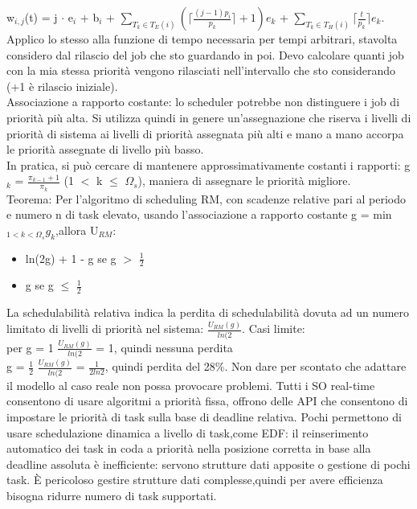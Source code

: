 \documentclass[12pt, oneside]{extbook}
\begin{document}
w$_{i,j}$(t) = j $\cdot$ e$_i$ + b$_i$ + $\sum\limits_{T_k \in T_E(i)} (\lceil \frac{(j-1)p_i}{p_k} \rceil + 1)e_k$ + $\sum\limits_{T_k \in T_H(i)} \lceil \frac{t}{p_k} \rceil e_k$. Applico lo stesso alla funzione di tempo necessaria per tempi arbitrari, stavolta considero dal rilascio del job che sto guardando in poi. Devo calcolare quanti job con la mia stessa priorità vengono rilasciati nell'intervallo che sto considerando (+1 è rilascio iniziale).\\ Associazione a rapporto costante: lo scheduler potrebbe non distinguere i job di priorità più alta. Si utilizza quindi in genere un'assegnazione  che riserva i livelli di priorità di sistema ai livelli di priorità assegnata più alti e mano a mano accorpa le priorità assegnate di livello più basso.\\ In pratica, si può cercare di mantenere approssimativamente costanti i rapporti: g$_k$ = $\frac{\pi_{k-1} + 1}{\pi_k}$ (1 $<$ k $\leq$ $\Omega_s$), maniera di assegnare le priorità migliore.\\ Teorema: Per l'algoritmo di scheduling RM,  con scadenze relative pari al periodo e numero n di task elevato, usando l'associazione a rapporto costante g = min$_{1 < k < \Omega_s} g_k$,allora U$_{RM}$:
\begin{itemize}
\item ln(2g) + 1 - g se g $>$ $\frac{1}{2}$
\item g se g $\leq$ $\frac{1}{2}$
\end{itemize}
La schedulabilità relativa indica la perdita di schedulabilità dovuta ad un numero limitato di livelli di priorità nel sistema: $\frac{U_{RM}(g)}{ln(2}$. Casi limite:\\ per g = 1 $\frac{U_{RM}(g)}{ln(2}$ = 1, quindi nessuna perdita\\ g = $\frac{1}{2}$ $\frac{U_{RM}(g)}{ln(2}$ = $\frac{1}{2ln2}$, quindi perdita del 28\%. Non dare per scontato che adattare il modello al caso reale non possa provocare problemi. Tutti i SO real-time consentono di usare algoritmi a priorità fissa, offrono delle API che consentono di impostare le priorità di task sulla base di deadline relativa. Pochi permettono di usare schedulazione dinamica a livello di task,come EDF: il reinserimento automatico dei task in coda a priorità nella posizione corretta in base alla deadline assoluta è inefficiente: servono strutture dati apposite o gestione di pochi task. È pericoloso gestire strutture dati complesse,quindi per avere efficienza bisogna ridurre numero di task supportati.
\end{document}
